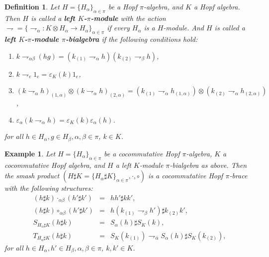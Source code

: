\documentclass[11pt]{article}
\def\a{\alpha}
\def\b{\beta}
\def\v{\varepsilon}
\newtheorem{definition}[theorem]{Definition}
\newtheorem{example}[theorem]{Example}
\begin{document}
\begin{definition}
Let $H=\{H_\a\}_{\a\in\pi}$ be a Hopf $\pi$-algebra, and $K$ a Hopf algebra. Then $H$ is called a {\bf left $K$-$\pi$-module} with the action $\rightharpoondown=\{\rightharpoondown_\a: K\otimes H_\a \rightarrow H_\a\}_{\a\in\pi}$ 
if every $H_\a$ is a $H$-module. And $H$ is called a {\bf left $K$-$\pi$-module $\pi$-bialgebra} if the following conditions hold:
\begin{enumerate}[\quad\rm(1)]
  \item $k\rightharpoondown_{\a\b}(hg)=(k_{(1)}\rightharpoondown_{\a}h)(k_{(2)}\rightharpoondown_{\b}h)$,
  \item $k\rightharpoondown_{e}1_e=\v_K(k)1_e$,
  \item $(k\rightharpoondown_{\a}h)_{(1,\a)} \otimes (k\rightharpoondown_{\a}h)_{(2,\a)} = (k_{(1)}\rightharpoondown_{\a}h_{(1,\a)})\otimes(k_{(2)}\rightharpoondown_{\a}h_{(2,\a)})$,
  \item $\v_\a(k\rightharpoondown_\a h)=\v_K(k)\v_\a(h)$.
\end{enumerate}
for all $h\in H_\a, g\in H_\b, \a,\b\in\pi$, $k\in K$.
\end{definition}

\begin{example} \label{ex:pimod}
Let $H=\{H_\a\}_{\a\in\pi}$ be a cocommutative Hopf $\pi$-algebra, $K$ a cocommutative Hopf algebra, 
and $H$ a left $K$-module  $\pi$-bialgebra as above. 
Then the smash product $(H\sharp K=\{H_\a\sharp K\}_{\a\in\pi},\cdot,\circ)$ is a cocommutative Hopf $\pi$-brace with the following structures:
\begin{eqnarray*}
  (h\sharp k)\cdot_{\a\b}(h'\sharp k') &=& hh'\sharp kk', \\
  (h\sharp k)\circ_{\a\b}(h'\sharp k') &=& h(k_{(1)}\rightharpoondown_{\b}h')\sharp k_{(2)}k', \\
  S_{H_\a\sharp K}(h\sharp k) &=& S_\a(h)\sharp S_K(k), \\
  T_{H_\a\sharp K}(h\sharp k) &=& S_K(k_{(1)})\rightharpoondown_{\bar{\a}}S_\a(h)\sharp S_K(k_{(2)}), 
\end{eqnarray*}
for all $h\in H_\a, h'\in H_\b, \a,\b\in\pi$, $k,k'\in K$.
\end{example}
\end{document}
